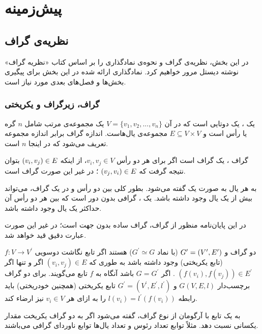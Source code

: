 \chapter{پیش‌زمینه}\label{chap:prerequisites}
\section{نظریه‌ی گراف}
در این بخش، نظریه‌ی گراف و نحوه‌ی نمادگذاری‌ را بر اساس کتاب «نظریه گراف» نوشته دیستل مرور خواهیم کرد. نمادگذاری ارائه شده در این بخش برای پیگیری بخش‌ها و فصل‌های بعدی مورد نیاز است.

\subsection{گراف، زیرگراف و یکریختی}
یک ، یک دوتایی  است که در آن
$V = \{v_{1},v_{2},...,v_{n}\}$
یک مجموعه‌ی مرتب شامل $n$ گره‌ یا رأس است و
$E \subseteq V\times V$
مجموعه‌ی یال‌هاست. اندازه گراف برابر اندازه مجموعه \V تعریف می‌شود که در اینجا $n$ است.

گراف ، یک گراف  است اگر برای هر دو رأس
$v_{i},v_{j} \in V$، از اینکه
$(v_{i},v_{j}) \in E$
بتوان نتیجه گرفت که
$(v_{j},v_{i}) \in E$
؛ در غیر این صورت گراف  است.

به هر یال به صورت 
یک  گفته می‌شود. بطور کلی بین دو رأس \Vi و \Vj در یک گراف، می‌تواند بیش از یک یال وجود داشته باشد. یک ، گرافی بدون دور است که بین هر دو رأس آن حداکثر یک یال وجود داشته باشد.

در این پایان‌نامه منظور از گراف، گراف ساده بدون جهت است؛ در غیر این صورت عبارت دقیق قید خواهد شد.

دو گراف  و
$G^{\prime} = (V^{\prime},E^{\prime})$
 (با نماد $G^{\prime} \simeq G$) هستند اگر تابع نگاشت دوسویی $f: V \rightarrow V^{\prime}$ (تابع یکریختی) وجود داشته باشد به طوری که
$(v_{i},v_{j}) \in E$
اگر و تنها اگر
$(f(v_{i}),f(v_{j})) \in E^{\prime}$
. اگر $G = G^{\prime}$ باشد آنگاه به $f$ تابع  می‌گویند. برای دو گراف برچسب‌دار $G(V,E,l)$ و $G^{\prime} = (V^{\prime},E^{\prime},l^{\prime})$ تابع یکریختی (همچنین خودریختی) باید رابطه 
$l(v_{i}) = l^{\prime}(f(v_{i}))$
 را به ازای هر $v_{i} \in V$ نیز ارضاء کند.
 
به یک تابع با آرگومان از نوع گراف،  گفته می‌شود اگر به دو گراف یکریخت مقدار یکسانی نسبت دهد. مثلاً توابع تعداد رئوس و تعداد یال‌ها توابع ناوردای گرافی می‌باشند.

